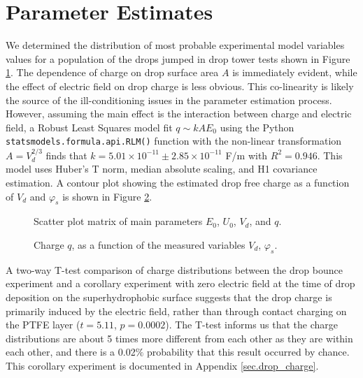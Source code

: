 \documentclass[12pt,a4paper,oneside]{book}
\begin{document}
\section{Parameter Estimates}
We determined the distribution of most probable experimental model variables values for a population of the drops jumped in drop tower tests shown in Figure \ref{fig:scatter}. The dependence of charge on drop surface area $A$ is immediately evident, while the effect of electric field on drop charge is less obvious. This co-linearity is likely the source of the ill-conditioning issues in the parameter estimation process. However, assuming the main effect is the interaction between charge and electric field, a Robust Least Squares model fit $q \sim kAE_0$ using the Python \verb|statsmodels.formula.api.RLM()| function with the non-linear transformation $A = V_d^{2/3}$ finds that $k=5.01 \times 10^{-11} \pm  2.85 \times 10^{-11}$ F/m with $R^2 = 0.946$. This model uses Huber's T norm, median absolute scaling, and H1 covariance estimation. A contour plot showing the estimated drop free charge as a function of $V_d$ and $\varphi_s$ is shown in Figure \ref{fig:charge}.
\begin{figure}[h]
    \centering
    \resizebox{12cm}{!}{}
    \caption{Scatter plot matrix of main parameters $E_0$, $U_0$, $V_d$, and $q$.\label{fig:scatter}}
\end{figure}
\begin{figure}[h]
    \centering
    
    \caption{Charge $q$, as a function of the measured variables $V_d$, $\varphi_s$.\label{fig:charge}}
\end{figure}

A two-way T-test comparison of charge distributions between the drop bounce experiment and a corollary experiment with zero electric field at the time of drop deposition on the superhydrophobic surface suggests that the drop charge is primarily induced by the electric field, rather than through contact charging on the PTFE layer ($t = 5.11$, $p = 0.0002$). The T-test informs us that the charge distributions are about 5 times more different from each other as they are within each other, and there is a 0.02$\%$ probability that this result occurred by chance. This corollary experiment is documented in Appendix \ref{sec.drop_charge}.
\end{document}
